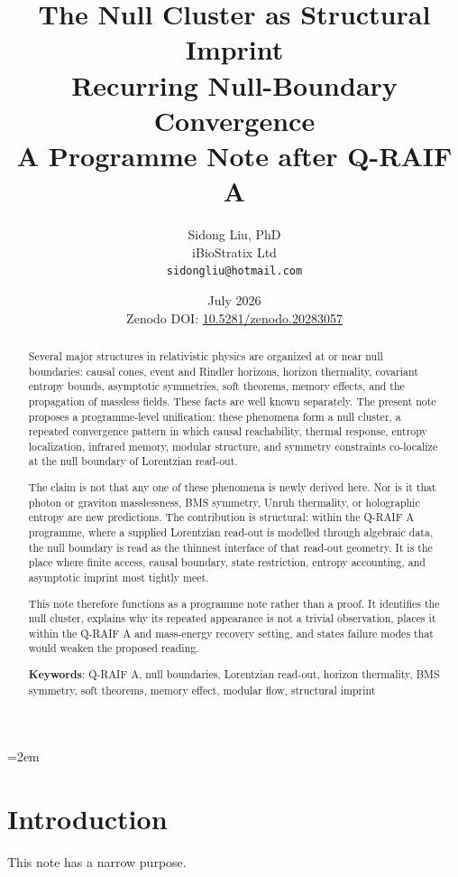 \documentclass[12pt,a4paper]{article}
\title{%
  \textbf{The Null Cluster as Structural Imprint}\\
  \textbf{Recurring Null-Boundary Convergence}\\
  \large A Programme Note after Q-RAIF A%
}
\author{
  Sidong Liu, PhD \\
  \small iBioStratix Ltd \\
  \small \texttt{sidongliu@hotmail.com}
}
\date{July 2026\\
\small Zenodo DOI: \href{https://doi.org/10.5281/zenodo.20283057}{10.5281/zenodo.20283057}}
\theoremstyle{definition}
\theoremstyle{remark}
\begin{document}
\emergencystretch=2em
\raggedbottom
{}

\maketitle

\begin{abstract}
Several major structures in relativistic physics are organized at or near null boundaries: causal cones, event and Rindler horizons, horizon thermality, covariant entropy bounds, asymptotic symmetries, soft theorems, memory effects, and the propagation of massless fields. These facts are well known separately. The present note proposes a programme-level unification: these phenomena form a null cluster, a repeated convergence pattern in which causal reachability, thermal response, entropy localization, infrared memory, modular structure, and symmetry constraints co-localize at the null boundary of Lorentzian read-out.

The claim is not that any one of these phenomena is newly derived here. Nor is it that photon or graviton masslessness, BMS symmetry, Unruh thermality, or holographic entropy are new predictions. The contribution is structural: within the Q-RAIF A programme, where a supplied Lorentzian read-out is modelled through algebraic data, the null boundary is read as the thinnest interface of that read-out geometry. It is the place where finite access, causal boundary, state restriction, entropy accounting, and asymptotic imprint most tightly meet.

This note therefore functions as a programme note rather than a proof. It identifies the null cluster, explains why its repeated appearance is not a trivial observation, places it within the Q-RAIF A and mass-energy recovery setting, and states failure modes that would weaken the proposed reading.

\medskip
\noindent\textbf{Keywords}: Q-RAIF A, null boundaries, Lorentzian read-out, horizon thermality, BMS symmetry, soft theorems, memory effect, modular flow, structural imprint
\end{abstract}

\clearpage
\tableofcontents
\clearpage
\section{Introduction}
\label{sec:introduction}

This note has a narrow purpose.
\end{document}
